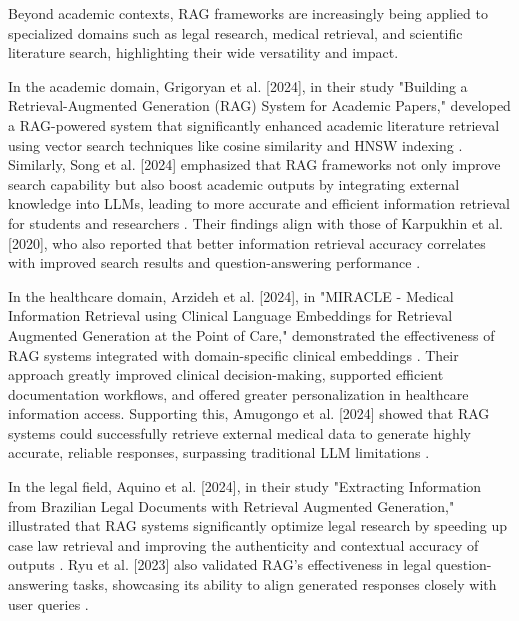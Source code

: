 \begin{refsection}
\hspace{1cm}Beyond academic contexts, RAG frameworks are increasingly being applied to specialized domains such as legal research, medical retrieval, and scientific literature search, highlighting their wide versatility and impact.

\hspace{0.4cm}In the academic domain, Grigoryan et al. [2024], in their study "Building a Retrieval-Augmented Generation (RAG) System for Academic Papers," developed a RAG-powered system that significantly enhanced academic literature retrieval using vector search techniques like cosine similarity and HNSW indexing \cite{grigoryan2024building}. Similarly, Song et al. [2024] emphasized that RAG frameworks not only improve search capability but also boost academic outputs by integrating external knowledge into LLMs, leading to more accurate and efficient information retrieval for students and researchers \cite{song2024travelrag}. Their findings align with those of Karpukhin et al. [2020], who also reported that better information retrieval accuracy correlates with improved search results and question-answering performance \cite{karpukhin2020dense}.


\hspace{0.4cm}In the healthcare domain, Arzideh et al. [2024], in "MIRACLE - Medical Information Retrieval using Clinical Language Embeddings for Retrieval Augmented Generation at the Point of Care," demonstrated the effectiveness of RAG systems integrated with domain-specific clinical embeddings \cite{arzideh2024miracle}. Their approach greatly improved clinical decision-making, supported efficient documentation workflows, and offered greater personalization in healthcare information access. Supporting this, Amugongo et al. [2024] showed that RAG systems could successfully retrieve external medical data to generate highly accurate, reliable responses, surpassing traditional LLM limitations \cite{amugongo2024retrieval}.

\hspace{0.4cm}In the legal field, Aquino et al. [2024], in their study "Extracting Information from Brazilian Legal Documents with Retrieval Augmented Generation," illustrated that RAG systems significantly optimize legal research by speeding up case law retrieval and improving the authenticity and contextual accuracy of outputs \cite{aquino2024extracting}. Ryu et al. [2023] also validated RAG's effectiveness in legal question-answering tasks, showcasing its ability to align generated responses closely with user queries \cite{ryu2023retrieval}.


\end{refsection}
